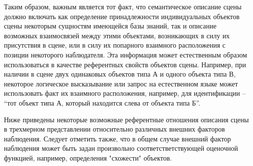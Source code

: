 Таким образом, важным является тот факт, что семантическое описание сцены должно включать как определение принадлежности индивидуальных объектов сцены некоторым сущностям имеющейся базы знаний, так и описание возможных взаимосвязей между этими объектами, возникающих в силу их присутствия в сцене, или в силу их попарного взаимного расположения с позиции некоторого наблюдателя. Эта информация может естественным образом использоваться в качестве референтных свойств объектов сцены. Например, при наличии в сцене двух одинаковых объектов типа А и одного объекта типа В, некоторое логическое высказывание или запрос на естественном языке может использовать факт их взаимного расположения, например, для идентификации -- ``тот объект типа А, который находится слева от объекта типа Б''.


\begin{SCn}
\end{SCn}
\begin{SCn}
\end{SCn}
\begin{SCn}
\end{SCn}


Ниже приведены некоторые возможные референтные отношения описания сцены в трехмерном представлении относительно различных внешних факторов наблюдения. Следует отметить также, что в общем случае внешний фактор наблюдения может быть задан произвольно соответстветствующей оценочной функцией, например, определения "схожести"{} объектов.

